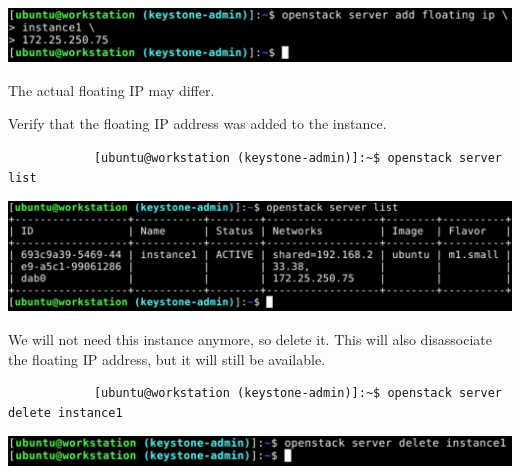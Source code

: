 \documentclass[letterpaper, 12pt]{article}
\begin{document}
\begin{enumerate}
\begin{labstep}
        \begin{center}
            \includegraphics[width=\linewidth]{images/part3/step23.png}
        \end{center}
    \end{labstep}

    \begin{notebox}
        The actual floating IP may differ.
    \end{notebox}

    \begin{labstep}
        Verify that the floating IP address was added to the instance.
        \begin{lstlisting}
            [ubuntu@workstation (keystone-admin)]:~$ openstack server list
        \end{lstlisting}

        \begin{center}
            \includegraphics[width=\linewidth]{images/part3/step24.png}
        \end{center}
    \end{labstep}

    \begin{labstep}
        We will not need this instance anymore, so delete it.
        This will also disassociate the floating IP address, but it will still be available.
        \begin{lstlisting}
            [ubuntu@workstation (keystone-admin)]:~$ openstack server delete instance1
        \end{lstlisting}

        \begin{center}
            \includegraphics[width=\linewidth]{images/part3/step25.png}
        \end{center}
    \end{labstep}


\end{enumerate}
\end{document}
